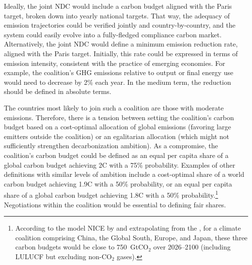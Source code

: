 \documentclass[12pt,english]{article}
\begin{document}
Ideally, the joint NDC would include a carbon budget aligned with the Paris target, broken down into yearly national targets. That way, the adequacy of emission trajectories could be verified jointly and country-by-country, 
and the system could easily evolve into a fully-fledged compliance carbon market. 
Alternatively, the joint NDC would define a minimum emission reduction rate, aligned with the Paris target. Initially, this rate could be expressed in terms of emission intensity, consistent with the practice of emerging economies. For example, the coalition's GHG emissions relative to output or final energy use%
would need to decrease by 2\% each year. In the medium term, the reduction should be defined in absolute terms.


The countries most likely to join such a coalition are those with moderate emissions. Therefore, there is a tension between setting the coalition's carbon budget based on a cost-optimal allocation of global emissions (favoring large emitters outside the coalition) or an egalitarian allocation (which might not sufficiently strengthen decarbonization ambition). 
As a compromise, the coalition's carbon budget could be defined as an equal per capita share of a global carbon budget achieving 2\textdegree{}C with a 75\% probability.
Examples of other definitions with similar levels of ambition include a cost-optimal share of a world carbon budget achieving 1.9\textdegree{}C with a 50\% probability, or an equal per capita share of a global carbon budget achieving 1.8\textdegree{}C with a 50\% probability.\footnote{According to the model NICE by \cite{young-brun_within-country_2025} and extrapolating from the \cite{ipcc_climate_2021}, for a climate coalition comprising China, the Global South, Europe, and Japan, these three carbon budgets would be close to 750~GtCO$_\text{2}$ over 2026--2100 (including LULUCF but excluding non-CO$_\text{2}$ gases).} %
Negotiations within the coalition would be essential to defining fair shares.  
\end{document}
